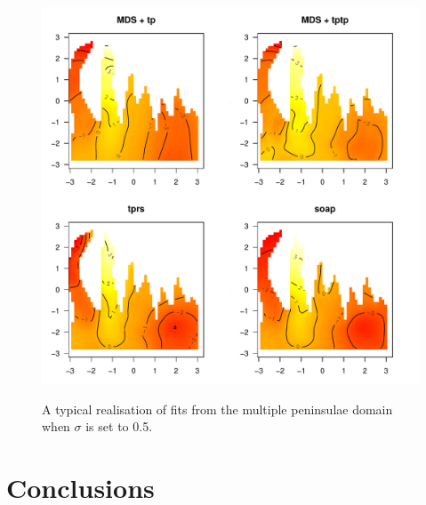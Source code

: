 \documentclass[a4paper,10pt]{article}
\begin{document}
\begin{figure}
\centering
\includegraphics[width=6in]{figs/wt2-fit-05.pdf} \\
\caption{A typical realisation of fits from the multiple peninsulae domain when $\sigma$ is set to 0.5.}
\label{wt2-fit-0.5}
\end{figure}



\section{Conclusions}
\end{document}
